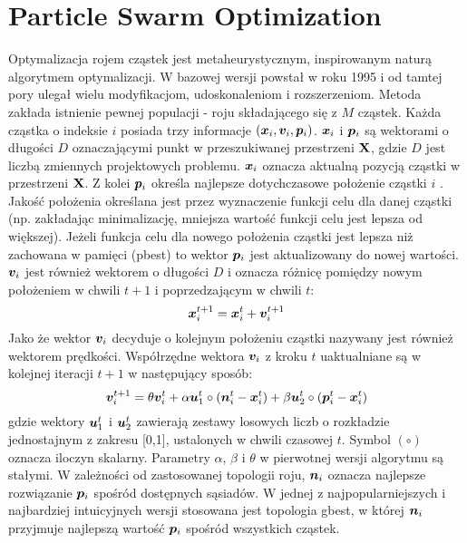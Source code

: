 \section{Particle Swarm Optimization}
Optymalizacja rojem cząstek  jest metaheurystycznym, inspirowanym naturą algorytmem optymalizacji. W bazowej wersji powstał w roku 1995 \parencite{Kennedy1995a,Eberhart1995} i od tamtej pory ulegał wielu modyfikacjom, udoskonaleniom i rozszerzeniom. Metoda zakłada istnienie pewnej populacji - roju składającego się z $M$ cząstek. Każda cząstka o indeksie $i$ posiada trzy informacje $(\bm{x}_i,\bm{v}_i,\bm{p}_i)$. $\bm{x}_i$ i $\bm{p}_i$ są wektorami o długości $D$ oznaczającymi punkt w przeszukiwanej przestrzeni $\mathbf{X}$, gdzie $D$ jest liczbą zmiennych projektowych problemu. $\bm{x}_i$ oznacza aktualną pozycją cząstki w przestrzeni $\mathbf{X}$. Z kolei $\bm{p}_i$ określa najlepsze dotychczasowe położenie cząstki $i$ . Jakość położenia określana jest przez wyznaczenie funkcji celu dla danej cząstki (np. zakładając minimalizację, mniejsza wartość funkcji celu jest lepsza od większej). Jeżeli funkcja celu dla nowego położenia cząstki jest lepsza niż zachowana w pamięci (pbest) to wektor $\bm{p}_i$ jest aktualizowany do nowej wartości. $\bm{v}_i$ jest również wektorem o długości $D$ i oznacza różnicę pomiędzy nowym położeniem w chwili $t+1$ i poprzedzającym w chwili $t$:
\begin{equation} \label{eq: pso_position}
	\bm{x}_i^{t+1}=\bm{x}_i^t+\bm{v}_i^{t+1}
\end{equation}
 Jako że wektor $\bm{v}_i$ decyduje o kolejnym położeniu cząstki nazywany jest również wektorem prędkości. Współrzędne wektora $\bm{v}_i$ z kroku $t$ uaktualniane są w kolejnej iteracji $t+1$ w następujący sposób:
\begin{equation} \label{eq: pso_velocity}
	\bm{v}_{i}^{t+1}=\theta\bm{v}_i^t+\alpha\bm{u}_1^t\circ (\bm{n}_i^t-\bm{x}_i^t)+\beta\bm{u}_2^t\circ(\bm{p}_i^t-\bm{x}_i^t)
\end{equation}
gdzie wektory $\bm{u}_1^t$ i $\bm{u}_2^t$ zawierają zestawy losowych liczb o rozkładzie jednostajnym z zakresu [0,1], ustalonych w chwili czasowej $t$. Symbol $(\circ)$ oznacza iloczyn skalarny. Parametry $\alpha$, $\beta$ i $\theta$ w pierwotnej wersji algorytmu są stałymi. W zależności od zastosowanej topologii roju, $\bm{n}_i$ oznacza najlepsze rozwiązanie $\bm{p}_i$ spośród dostępnych sąsiadów. W jednej z najpopularniejszych i najbardziej intuicyjnych wersji stosowana jest topologia gbest, w której $\bm{n}_i$ przyjmuje najlepszą wartość $\bm{p}_i$ spośród wszystkich cząstek.
